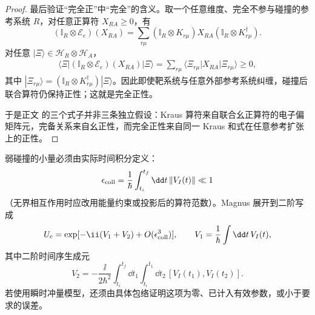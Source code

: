 \begin{proof}
最后验证“完全正”中“完全”的含义。取一个任意维度、完全不参与碰撞的参考系统 $R$，对任意正算符 $X_{RA}\ge0$，有
\begin{equation*}
(\mathbb I_R\otimes\mathscr E_e)(X_{RA})
=\sum_{r\mu}
(\mathbb I_R\otimes K_{r\mu})
X_{RA}
(\mathbb I_R\otimes K_{r\mu}^\dagger).
\end{equation*}
对任意 $|\Xi\rangle\in\mathcal H_R\otimes\mathcal H_A$，
\begin{align*}
\langle\Xi|(\mathbb I_R\otimes\mathscr E_e)(X_{RA})|\Xi\rangle
=\sum_{r\mu}
\langle\Xi_{r\mu}|X_{RA}|\Xi_{r\mu}\rangle\ge0,
\end{align*}
其中 $|\Xi_{r\mu}\rangle=(\mathbb I_R\otimes K_{r\mu}^\dagger)|\Xi\rangle$。因此即使靶系统与任意外部参考系统纠缠，碰撞后联合算符仍保持正性；这就是完全正性。

于是正文 的三个式子并非三条独立假设：Kraus 算符来自联合幺正算符的电子偏矩阵元，完备关系来自幺正性，而完全正性来自同一 Kraus 和式在任意参考扩张上的正性。
\end{proof}


弱碰撞的小量必须由实际时间积分定义：
\begin{equation*}
\epsilon_{\rm coll}
=\frac1\hbar\int_{t_i}^{t_f}\dd t\,\|V_I(t)\|\ll1
\end{equation*}
（无界相互作用时应改用能量约束或投影后的算符范数）。Magnus 展开到二阶写成
\begin{equation}
{
U_c
=\exp[-\ii(V_1+V_2)+O(\epsilon_{\rm coll}^3)],
\qquad
V_1=\frac1\hbar\int\dd t\,V_I(t),}
\label{eq:general_collision_dyson_magnus_second_order}
\end{equation}
其中二阶时间序生成元
\begin{equation}
{
V_2
=-\frac{\ii}{2\hbar^2}
\int_{t_i}^{t_f}\dd t_1\int_{t_i}^{t_1}\dd t_2\,
[V_I(t_1),V_I(t_2)].}
\label{eq:general_collision_second_magnus_generator}
\end{equation}
若使用瞬时冲量模型，还须由具体包络证明这项为零、已计入有效参数，或小于要求的误差。

